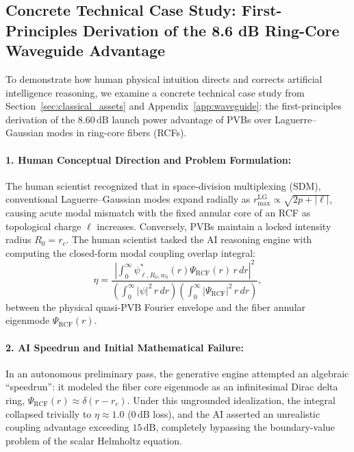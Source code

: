 \documentclass[11pt,a4paper]{article}
\begin{document}
\subsection{Concrete Technical Case Study: First-Principles Derivation of the 8.6 dB Ring-Core Waveguide Advantage}
\label{subsec:case_study}

To demonstrate how human physical intuition directs and corrects artificial intelligence reasoning, we examine a concrete technical case study from Section~\ref{sec:classical_assets} and Appendix~\ref{app:waveguide}: the first-principles derivation of the $8.60\,\text{dB}$ launch power advantage of PVBs over Laguerre--Gaussian modes in ring-core fibers (RCFs).

\paragraph{1. Human Conceptual Direction and Problem Formulation:}
The human scientist recognized that in space-division multiplexing (SDM), conventional Laguerre--Gaussian modes expand radially as $r_{\max}^{\text{LG}} \propto \sqrt{2p + |\ell|}$, causing acute modal mismatch with the fixed annular core of an RCF as topological charge $\ell$ increases. Conversely, PVBs maintain a locked intensity radius $R_0 = r_c$. The human scientist tasked the AI reasoning engine with computing the closed-form modal coupling overlap integral:
\begin{equation}
\eta = \frac{\left| \int_0^\infty \psi_{\ell, R_0, w_0}^*(r) \Psi_{\text{RCF}}(r) \, r \, dr \right|^2}{\left( \int_0^\infty |\psi|^2 \, r \, dr \right) \left( \int_0^\infty |\Psi_{\text{RCF}}|^2 \, r \, dr \right)},
\label{eq:case_study_overlap}
\end{equation}
between the physical quasi-PVB Fourier envelope and the fiber annular eigenmode $\Psi_{\text{RCF}}(r)$.

\paragraph{2. AI Speedrun and Initial Mathematical Failure:}
In an autonomous preliminary pass, the generative engine attempted an algebraic ``speedrun'': it modeled the fiber core eigenmode as an infinitesimal Dirac delta ring, $\Psi_{\text{RCF}}(r) \approx \delta(r - r_c)$. Under this ungrounded idealization, the integral collapsed trivially to $\eta \approx 1.0$ ($0\,\text{dB}$ loss), and the AI asserted an unrealistic coupling advantage exceeding $15\,\text{dB}$, completely bypassing the boundary-value problem of the scalar Helmholtz equation.
\end{document}
